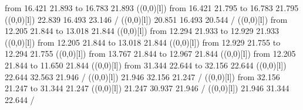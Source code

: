 {{\color[rgb]{0,0,0}\putrule from 16.421 21.893 to 16.783 21.893
}%
%
%
\linethickness=1pt
\setplotsymbol ({\makebox(0,0)[l]{\tencirc{}}})
{\color[rgb]{0,0,0}\putrule from 16.421 21.795 to 16.783 21.795
}%
%
%
\linethickness=1pt
\setplotsymbol ({\makebox(0,0)[l]{\tencirc{}}})
{\color[rgb]{0,0,0} 22.839 16.493 23.146 /
}%
%
%
\linethickness=1pt
\setplotsymbol ({\makebox(0,0)[l]{\tencirc{}}})
{\color[rgb]{0,0,0} 20.851 16.493 20.544 /
}%
%
%
\linethickness=1pt
\setplotsymbol ({\makebox(0,0)[l]{\tencirc{}}})
{\color[rgb]{0,0,0}\putrule from 12.205 21.844 to 13.018 21.844
}%
%
%
\linethickness=1pt
\setplotsymbol ({\makebox(0,0)[l]{\tencirc{}}})
{\color[rgb]{0,0,0}\putrule from 12.294 21.933 to 12.929 21.933
}%
%
%
\linethickness=1pt
\setplotsymbol ({\makebox(0,0)[l]{\tencirc{}}})
{\color[rgb]{0,0,0}\putrule from 12.205 21.844 to 13.018 21.844
}%
%
%
\linethickness=1pt
\setplotsymbol ({\makebox(0,0)[l]{\tencirc{}}})
{\color[rgb]{0,0,0}\putrule from 12.929 21.755 to 12.294 21.755
}%
%
%
\linethickness=1pt
\setplotsymbol ({\makebox(0,0)[l]{\tencirc{}}})
{\color[rgb]{0,0,0}\putrule from 13.767 21.844 to 12.967 21.844
}%
%
%
\linethickness=1pt
\setplotsymbol ({\makebox(0,0)[l]{\tencirc{}}})
{\color[rgb]{0,0,0}\putrule from 12.205 21.844 to 11.650 21.844
}%
%
%
\linethickness=1pt
\setplotsymbol ({\makebox(0,0)[l]{\tencirc{}}})
{\color[rgb]{0,0,0}\putrule from 31.344 22.644 to 32.156 22.644
}%
%
%
\linethickness=1pt
\setplotsymbol ({\makebox(0,0)[l]{\tencirc{}}})
{\color[rgb]{0,0,0} 22.644 32.563 21.946 /
}%
%
%
\linethickness=1pt
\setplotsymbol ({\makebox(0,0)[l]{\tencirc{}}})
{\color[rgb]{0,0,0} 21.946 32.156 21.247 /
}%
%
%
\linethickness=1pt
\setplotsymbol ({\makebox(0,0)[l]{\tencirc{}}})
{\color[rgb]{0,0,0}\putrule from 32.156 21.247 to 31.344 21.247
}%
%
%
\linethickness=1pt
\setplotsymbol ({\makebox(0,0)[l]{\tencirc{}}})
{\color[rgb]{0,0,0} 21.247 30.937 21.946 /
}%
%
%
\linethickness=1pt
\setplotsymbol ({\makebox(0,0)[l]{\tencirc{}}})
{\color[rgb]{0,0,0} 21.946 31.344 22.644 /
}%
%
}
